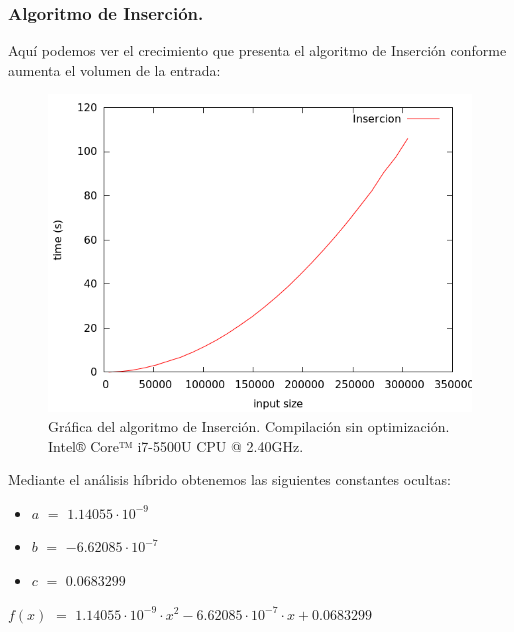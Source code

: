 \documentclass[11pt,a4paper]{article}
\begin{document}
\newpage

			\subsubsection{Algoritmo de Inserción.}

				\par
				Aquí podemos ver el crecimiento que presenta el algoritmo de Inserción conforme aumenta el volumen de la entrada:

				\begin{figure}[h]

					\centering
					\includegraphics[width=1\textwidth]{insercion.png}
					\caption{Gráfica del algoritmo de Inserción. Compilación sin optimización. Intel® Core™ i7-5500U CPU @ 2.40GHz.}

				\end{figure}

				\par
				Mediante el análisis híbrido obtenemos las siguientes constantes ocultas:

				\begin{itemize}

					\item
					$a$ $=$ $1.14055\cdot 10^{-9}$
					\item
					$b$ $=$ $-6.62085\cdot 10^{-7}$
					\item
					$c$ $=$ $0.0683299$

				\end{itemize}

				\par
				$f(x)$ $=$ $ 1.14055\cdot 10^{-9}\cdot x^2 - 6.62085\cdot 10^{-7}\cdot x+ 0.0683299$
\end{document}
